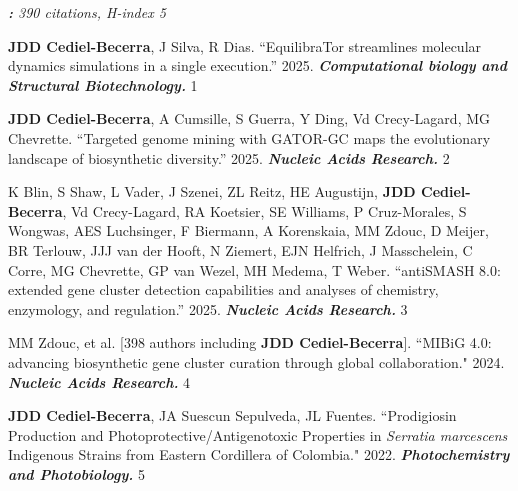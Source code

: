 
\textit{\textbf{:} 390 citations, H-index 5}

 \vspace{-2mm}

\begin{cvpubs}

\cvpub
{\textbf{JDD Cediel-Becerra}, J Silva, R Dias. ``EquilibraTor streamlines molecular dynamics simulations in a single execution.'' 2025. \textit{\textbf{Computational biology and Structural Biotechnology.}} \textit{\textbf{}}}
{1}

\cvpub
{\textbf{JDD Cediel-Becerra}, A Cumsille, S Guerra, Y Ding, Vd Crecy-Lagard, MG Chevrette. ``Targeted genome mining with GATOR-GC maps the evolutionary landscape of biosynthetic diversity.'' 2025. \textit{\textbf{Nucleic Acids Research.}} \textit{\textbf{}}}
{2}

\cvpub
{K Blin, S Shaw, L Vader, J Szenei, ZL Reitz, HE Augustijn, \textbf{JDD Cediel-Becerra}, Vd Crecy-Lagard, RA Koetsier, SE Williams, P Cruz-Morales, S Wongwas, AES Luchsinger, F Biermann, A Korenskaia, MM Zdouc, D Meijer, BR Terlouw, JJJ van der Hooft, N Ziemert, EJN Helfrich, J Masschelein, C Corre, MG Chevrette, GP van Wezel, MH Medema, T Weber. ``antiSMASH 8.0: extended gene cluster detection capabilities and analyses of chemistry, enzymology, and regulation.'' 2025. \textit{\textbf{Nucleic Acids Research.}} \textit{\textbf{}}}
{3}

\cvpub
{MM Zdouc, et al. [398 authors including \textbf{JDD Cediel-Becerra}]. ``MIBiG 4.0: advancing biosynthetic gene cluster curation through global collaboration." 2024. \textit{\textbf{Nucleic Acids Research.}} \textit{\textbf{}}}
{4}

\cvpub
{\textbf{JDD Cediel-Becerra}, JA Suescun Sepulveda, JL Fuentes. ``Prodigiosin Production and Photoprotective/Antigenotoxic Properties in \textit{Serratia marcescens} Indigenous Strains from Eastern Cordillera of Colombia." 2022. \textit{\textbf{Photochemistry and Photobiology.}}\textit{\textbf{}}}
{5}

\end{cvpubs}

